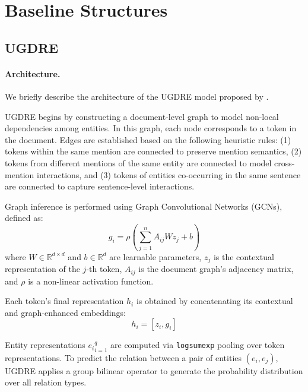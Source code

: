 \section{Baseline Structures}
\label{appendix:baseline-structures}

\subsection{UGDRE}
\label{sec:ugdre}
\paragraph{Architecture.}
We briefly describe the architecture of the UGDRE model proposed by \citet{sun2023uncertainty}.

UGDRE begins by constructing a document-level graph to model non-local dependencies among entities. In this graph, each node corresponds to a token in the document. Edges are established based on the following heuristic rules: (1) tokens within the same mention are connected to preserve mention semantics, (2) tokens from different mentions of the same entity are connected to model cross-mention interactions, and (3) tokens of entities co-occurring in the same sentence are connected to capture sentence-level interactions.

Graph inference is performed using Graph Convolutional Networks (GCNs), defined as:
\begin{equation} 
    g_i = \rho\left(\sum_{j=1}^n A_{ij} W z_j + b\right) 
\end{equation} 
where $W \in \mathbb{R}^{d \times d}$ and $b \in \mathbb{R}^d$ are learnable parameters, $z_j$ is the contextual representation of the $j$-th token, $A_{ij}$ is the document graph’s adjacency matrix, and $\rho$ is a non-linear activation function.

Each token’s final representation $h_i$ is obtained by concatenating its contextual and graph-enhanced embeddings: 
\begin{equation} 
    h_i = [z_i, g_i] 
\end{equation}

Entity representations ${e_i}_{i=1}^q$ are computed via \texttt{logsumexp} pooling over token representations. To predict the relation between a pair of entities $(e_i, e_j)$, UGDRE applies a group bilinear operator to generate the probability distribution over all relation types.

